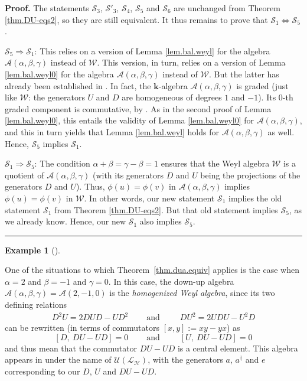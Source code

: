 \documentclass[numbers=enddot,12pt,final,onecolumn,notitlepage]{scrartcl}%
\theoremstyle{definition}
\newtheorem{exam}[theo]{Example}
\newenvironment{example}[1][]
{\begin{exam}[#1]\begin{leftbar}}
{\end{leftbar}\end{exam}}
\newenvironment{proof}[1][Proof]{\noindent\textbf{#1.} }{\ \rule{0.5em}{0.5em}}
\newcommand{\W}{\mathcal{W}}
\newcommand{\kk}{\mathbf{k}}
\begin{document}
\begin{proof}
The statements $\mathcal{S}_{3}$, $\mathcal{S}'_3$, $\mathcal{S}_{4}$,
$\mathcal{S}_{5}$ and $\mathcal{S}_6$
are unchanged from Theorem \ref{thm.DU-eqs2}, so they are
still equivalent. It thus remains to prove that $\mathcal{S}_{1}%
\Longleftrightarrow\mathcal{S}_{5}$.

$\mathcal{S}_{5}\Longrightarrow\mathcal{S}_{1}$: This relies on a version of
Lemma \ref{lem.bal.weyl} for the algebra $\mathcal{A}\left(  \alpha
,\beta,\gamma\right)  $ instead of $\W$.
This version, in turn, relies on a version of Lemma \ref{lem.bal.weyl0} for the algebra $\mathcal{A}\left(  \alpha
,\beta,\gamma\right)  $ instead of $\W$.
But the latter has already been established in \cite{BenRob98}.
In fact, the $\kk$-algebra $\mathcal{A}\left(
\alpha,\beta,\gamma\right)  $ is graded (just like $\W$: the
generators $U$ and $D$ are homogeneous of degrees $1$ and $-1$). Its $0$-th
graded component is commutative, by \cite[Proposition 3.5]{BenRob98}. As in
the second proof of Lemma \ref{lem.bal.weyl0}, this entails the validity of Lemma
\ref{lem.bal.weyl0} for $\mathcal{A}\left(  \alpha
,\beta,\gamma\right)  $, and this in turn yields that Lemma \ref{lem.bal.weyl} holds for $\mathcal{A}\left(  \alpha
,\beta,\gamma\right)  $ as well.
Hence, $\mathcal{S}_{5}$ implies
$\mathcal{S}_{1}$.

$\mathcal{S}_{1}\Longrightarrow\mathcal{S}_{5}$: The condition $\alpha
+\beta=\gamma-\beta=1$ ensures that the Weyl algebra $\W$ is a
quotient of $\mathcal{A}\left(  \alpha,\beta,\gamma\right)  $ (with its
generators $D$ and $U$ being the projections of the generators $D$ and $U$).
Thus, $\phi\left(  u\right)  =\phi\left(  v\right)  $ in $\mathcal{A}\left(
\alpha,\beta,\gamma\right)  $ implies $\phi\left(  u\right)  =\phi\left(
v\right)  $ in $\W$. In other words, our new statement $\mathcal{S}%
_{1}$ implies the old statement $\mathcal{S}_{1}$ from Theorem
\ref{thm.DU-eqs2}. But that old statement implies $\mathcal{S}_{5}$, as we
already know.
Hence, our new $\mathcal{S}_1$ also implies $\mathcal{S}_5$.
\end{proof}

\begin{example}
One of the situations to which Theorem~\ref{thm.dua.equiv} applies is the case when $\alpha = 2$ and $\beta = -1$ and $\gamma = 0$.
In this case, the down-up algebra $\mathcal{A}\left(\alpha,\beta,\gamma\right) = \mathcal{A}\left(2,-1,0\right)$ is the \emph{homogenized Weyl algebra}, since its two defining relations
\begin{align*}
D^{2}U =2 DUD- UD^{2}\ \ \ \ \ \ \ \ \ \ \text{and}\ \ \ \ \ \ \ \ \ \ \ DU^{2} =2 UDU- U^{2}D
\end{align*}
can be rewritten (in terms of commutators $\left[x,y\right] := xy-yx$) as
\[
\left[D,\ DU-UD\right] = 0 \ \ \ \ \ \ \ \ \ \ \text{and}\ \ \ \ \ \ \ \ \ \ \ \left[U,\ DU-UD\right] = 0
\]
and thus mean that the commutator $DU - UD$ is a central element.
This algebra appears in \cite[\S 2.3]{BDSHP10} under the name of $\mathcal{U}\left(\mathcal{L}_{\mathcal{H}}\right)$, with the generators $a$, $a^\dagger$ and $e$ corresponding to our $D$, $U$ and $DU-UD$.
\end{example}
\end{document}
